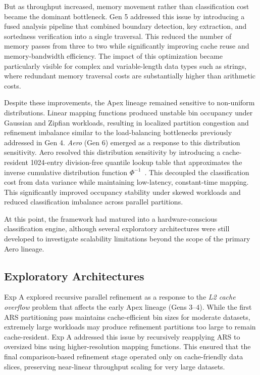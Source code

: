 But as throughput increased, memory movement rather than classification cost became the dominant bottleneck. 
Gen 5 addressed this issue by introducing a fused analysis pipeline that combined boundary detection, key extraction, and sortedness verification into a single traversal. 
This reduced the number of memory passes from three to two while significantly improving cache reuse and memory-bandwidth efficiency. 
The impact of this optimization became particularly visible for complex and variable-length data types such as strings, where redundant memory traversal costs are substantially higher than arithmetic costs.

Despite these improvements, the Apex lineage remained sensitive to non-uniform distributions.
Linear mapping functions produced unstable bin occupancy under Gaussian and Zipfian workloads, resulting in localized partition congestion and refinement imbalance similar to the load-balancing bottlenecks previously addressed in Gen 4.
\textit{Aero} (Gen 6) emerged as a response to this distribution sensitivity.
Aero resolved this distribution sensitivity by introducing a cache-resident 1024-entry division-free quantile lookup table that approximates the inverse cumulative distribution function $\Phi^{-1}$~\cite{devroyeNonUniformRandomVariate1986}. This decoupled the classification cost from data variance while maintaining low-latency, constant-time mapping.
This significantly improved occupancy stability under skewed workloads and reduced classification imbalance across parallel partitions.

At this point, the framework had matured into a hardware-conscious classification engine, although several exploratory architectures were still developed to investigate scalability limitations beyond the scope of the primary Aero lineage.

\subsection{Exploratory Architectures}
Exp A explored recursive parallel refinement as a response to the \textit{L2 cache overflow} problem that affects the early Apex lineage (Gens 3--4).
While the first ARS partitioning pass maintains cache-efficient bin sizes for moderate datasets, extremely large workloads may produce refinement partitions too large to remain cache-resident.
Exp A addressed this issue by recursively reapplying ARS to oversized bins using higher-resolution mapping functions.
This ensured that the final comparison-based refinement stage operated only on cache-friendly data slices, preserving near-linear throughput scaling for very large datasets.

